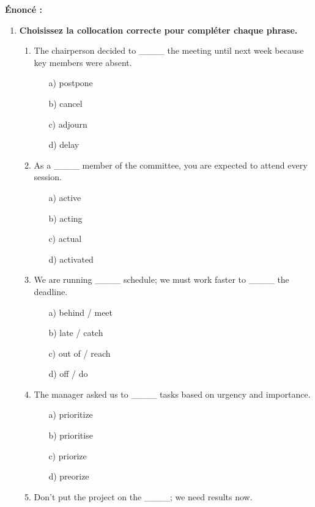\documentclass[11pt]{article}
\begin{document}
\begin{exoresolu}
\textbf{Énoncé :}
\begin{enumerate}
    \item \textbf{Choisissez la collocation correcte pour compléter chaque phrase.}
    \begin{enumerate}
        \item The chairperson decided to \_\_\_\_ the meeting until next week because key members were absent.
              \begin{itemize}
                  \item[a)] postpone \item[b)] cancel \item[c)] adjourn \item[d)] delay
              \end{itemize}
        \item As a \_\_\_\_ member of the committee, you are expected to attend every session.
              \begin{itemize}
                  \item[a)] active \item[b)] acting \item[c)] actual \item[d)] activated
              \end{itemize}
        \item We are running \_\_\_\_ schedule; we must work faster to \_\_\_\_ the deadline.
              \begin{itemize}
                  \item[a)] behind / meet \item[b)] late / catch \item[c)] out of / reach \item[d)] off / do
              \end{itemize}
        \item The manager asked us to \_\_\_\_ tasks based on urgency and importance.
              \begin{itemize}
                  \item[a)] prioritize \item[b)] prioritise \item[c)] priorize \item[d)] preorize
              \end{itemize}
        \item Don't put the project on the \_\_\_\_; we need results now.

\end{enumerate}
\end{enumerate}
\end{exoresolu}
\end{document}
